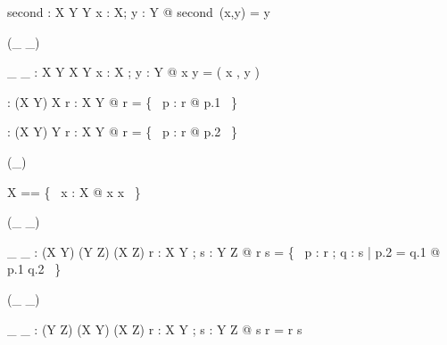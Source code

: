 \begin{gendef}[X,Y]
second : X \cross Y \fun Y
\where
\forall x : X; y : Y @ second~(x,y) = y
\end{gendef}

\begin{zed}
 \leftassoc (\_ \mapsto \_)
\end{zed}

\begin{gendef}[X,Y]
\_ \mapsto \_ : X \cross Y \fun X \cross Y
\where
\forall x : X ; y : Y @ x \mapsto y = ( x , y )
\end{gendef}

\begin{gendef}[X,Y]
\dom : (X \rel Y) \fun \power X
\where
\forall r : X \rel Y @ \dom r = \{~ p : r @ p.1 ~\}
\end{gendef}

\begin{gendef}[X,Y]
\ran : (X \rel Y) \fun \power Y
\where
\forall r : X \rel Y @ \ran r = \{~ p : r @ p.2 ~\}
\end{gendef}

\begin{zed}
\generic (\id \_)
\end{zed}

\begin{zed}
\id X == \{~ x : X @ x \mapsto x ~\}
\end{zed}

\begin{zed}
 \leftassoc (\_ \comp \_)
\end{zed}

\begin{gendef}[X,Y,Z]
\_ \comp \_ : (X \rel Y) \cross (Y \rel Z) \fun (X \rel Z)
\where
\forall r : X \rel Y ; s : Y \rel Z @
 r \comp s = \{~ p : r ; q : s | p.2 = q.1 @ p.1 \mapsto q.2 ~\}
\end{gendef}

\begin{zed}
 \leftassoc (\_ \circ \_)
\end{zed}

\begin{gendef}[X,Y,Z]
\_ \circ \_ : (Y \rel Z) \cross (X \rel Y) \fun (X \rel Z)
\where
\forall r : X \rel Y ; s : Y \rel Z @ s \circ r = r \comp s
\end{gendef}

